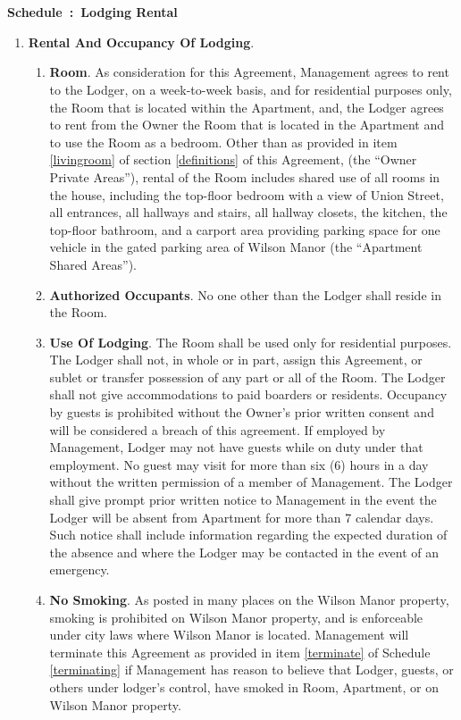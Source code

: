 \documentclass[]{article}
\newcounter{schedulecounter}
\renewcommand{\theschedulecounter}{\Alph{schedulecounter}}
\newenvironment{schedule}[1] {%
	\refstepcounter{schedulecounter}%
	\noindent \textbf{\Large Schedule~\theschedulecounter:~{#1}}
	\noindent
}{}
\newcommand{\therental}{Lodging Rental}
\newcommand{\management}{Management}
\newcommand{\condo}{Wilson Manor}
\newcommand{\apt}{Apartment}
\newcommand{\room}{Room}
\newcommand{\shared}{Apartment Shared Areas}
\newcommand{\livingroom}{Owner Private Areas}
\begin{document}
\section*{} %
\newpage
\begin{schedule}{\therental{}} \label{therental}
\begin{enumerate}
	\item \textbf{Rental And Occupancy Of Lodging}. 
		\begin{enumerate}
			\item \textbf{Room}.
				As consideration for this Agreement, \management{} agrees to rent to the Lodger, on a week-to-week basis, and for residential purposes only, the \room{} that is located within the \apt{}, and, the Lodger agrees to rent from the Owner the \room{} that is located in the \apt{} and to use the \room{} as a bedroom.  Other than as provided in item \ref{livingroom} of section \ref{definitions} of this Agreement, (the ``\livingroom{}''), rental of the \room{} includes shared use of all rooms in the house, including the top-floor bedroom with a view of Union Street, all entrances, all hallways and stairs, all hallway closets, the kitchen, the top-floor bathroom, and a carport area providing parking space for one vehicle in the gated parking area of \condo{} (the ``\shared{}'').
			\item \textbf{Authorized Occupants}. No one other than the Lodger shall reside in the \room{}. 
			\item \textbf{Use Of Lodging}. The \room{} shall be used only for residential purposes. The Lodger shall not, in whole or in part, assign this Agreement, or sublet or transfer possession of any part or all of the \room{}. The Lodger shall not give accommodations to paid boarders or residents. Occupancy by guests is prohibited without the Owner's prior written consent and will be considered a breach of this agreement. If employed by \management{}, Lodger may not have guests while on duty under that employment. No guest may visit for more than six (6) hours in a day without the written permission of a member of \management{}. The Lodger shall give prompt prior written notice to \management{} in the event the Lodger will be absent from \apt{} for more than 7 calendar days. Such notice shall include information regarding the expected duration of the absence and where the Lodger may be contacted in the event of an emergency. 
			\item \textbf{No Smoking}. \label{smoking}
				As posted in many places on the \condo{} property, smoking is prohibited on \condo{} property, and is enforceable under city laws where \condo{} is located. \management{} will terminate this Agreement as provided in item \ref{terminate} of Schedule \ref{terminating} if \management{} has reason to believe that Lodger, guests, or others under lodger's control, have smoked in \room{}, \apt{}, or on \condo{} property.

\end{enumerate}
\end{enumerate}
\end{schedule}
\end{document}
